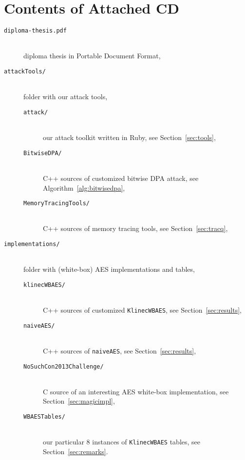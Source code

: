 \chapter{Contents of Attached CD}
\label{app:cd}
	
	\begin{description}
		\item[\tt diploma-thesis.pdf] ~ \\ diploma thesis in Portable Document Format,
		\item[\tt attackTools/] ~ \\ folder with our attack tools,
		\begin{description}
			\item[\tt attack/] ~ \\ our attack toolkit written in Ruby, see Section~\ref{sec:tools},
			\item[\tt BitwiseDPA/] ~ \\ C++ sources of customized bitwise DPA attack, see Algorithm~\ref{alg:bitwisedpa},
			\item[\tt MemoryTracingTools/] ~ \\ C++ sources of memory tracing tools, see Section~\ref{sec:tracq},
		\end{description}
		\item[\tt implementations/] ~ \\ folder with (white-box) AES implementations and tables,
		\begin{description}
			\item[\tt klinecWBAES/] ~ \\ C++ sources of customized {\tt KlinecWBAES}, see Section~\ref{sec:results},
			\item[\tt naiveAES/] ~ \\ C++ sources of {\tt naiveAES}, see Section~\ref{sec:results},
			\item[\tt NoSuchCon2013Challenge/] ~ \\ C source of an interesting AES white-box implementation, see Section~\ref{sec:magicimpl},
			\item[\tt WBAESTables/] ~ \\ our particular $8$ instances of {\tt KlinecWBAES} tables, see Section~\ref{sec:remarks}.
		\end{description}
	\end{description}

